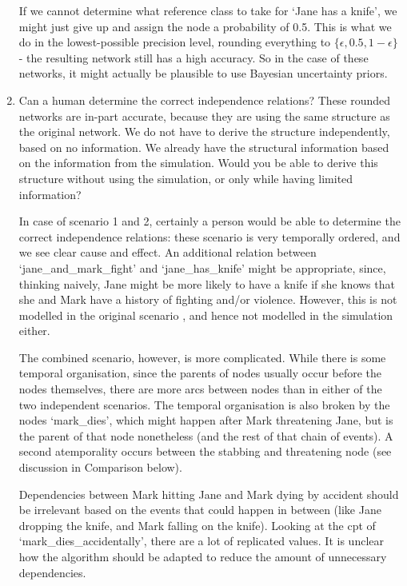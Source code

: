 \begin{enumerate}
If we cannot determine what reference class to take for `Jane has a knife', we might just give up and assign the node a probability of 0.5. This is what we do in the lowest-possible precision level, rounding everything to $\{\epsilon, 0.5 , 1-\epsilon\}$ - the resulting network still has a high accuracy. So in the case of these networks, it might actually be plausible to use Bayesian uncertainty priors.


\item Can a human determine the correct independence relations?
These rounded networks are in-part accurate, because they are using the same structure as the original network. We do not have to derive the structure independently, based on no information. We already have the structural information based on the information from the simulation. Would you be able to derive this structure without using the simulation, or only while having limited information?

In case of scenario 1 and 2, certainly a person would be able to determine the correct independence relations: these scenario is very temporally ordered, and we see clear cause and effect. An additional relation between `jane\_and\_mark\_fight' and `jane\_has\_knife' might be appropriate, since, thinking naively, Jane might be more likely to have a knife if she knows that she and Mark have a history of fighting and/or violence. However, this is not modelled in the original scenario \citep{Vlek2015}, and hence not modelled in the simulation either.

The combined scenario, however, is more complicated. While there is some temporal organisation, since the parents of nodes usually occur before the nodes themselves, there are more arcs between nodes than in either of the two independent scenarios. The temporal organisation is also broken by the nodes `mark\_dies', which might happen after Mark threatening Jane, but is the parent of that node nonetheless (and the rest of that chain of events). A second atemporality occurs between the stabbing and threatening node (see discussion in Comparison below). 

Dependencies between Mark hitting Jane and Mark dying by accident should be irrelevant based on the events that could happen in between (like Jane dropping the knife, and Mark falling on the knife). Looking at the cpt of `mark\_dies\_accidentally', there are a lot of replicated values. It is unclear how the algorithm should be adapted to reduce the amount of unnecessary dependencies.


\end{enumerate}


